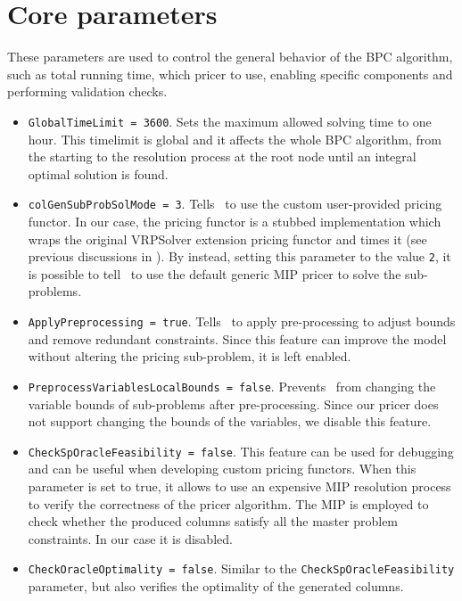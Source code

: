 \section{Core parameters}
These parameters are used to control the general behavior of the BPC algorithm,
such as total running time, which pricer to use, enabling specific
components and performing validation checks.

\begin{itemize}
	\item \texttt{GlobalTimeLimit = 3600}.
	      Sets the maximum allowed solving time to one hour.
	      This timelimit is global and it affects the whole BPC algorithm, from the starting
	      to the resolution process at the root node until an integral optimal solution is found.
	\item \texttt{colGenSubProbSolMode = 3}.
	      Tells \bapcod\ to use the custom user-provided pricing functor.
	      In our case, the pricing functor is a stubbed implementation which wraps the original VRPSolver extension pricing functor
	      and times it (see previous discussions in ).
	      By instead, setting this parameter to the value \texttt{2},
	      it is possible to tell \bapcod\ to use the default generic MIP pricer to solve the sub-problems.
	\item \texttt{ApplyPreprocessing = true}.
	      Tells \bapcod\ to apply pre-processing to adjust bounds and remove redundant constraints.
	      Since this feature can improve the model without altering the pricing sub-problem,
	      it is left enabled.
	\item \texttt{PreprocessVariablesLocalBounds = false}.
	      Prevents \bapcod\ from changing the variable bounds of sub-problems after pre-processing.
	      Since our pricer does not support changing the bounds of the variables,
	      we disable this feature.
	\item \texttt{CheckSpOracleFeasibility = false}.
	      This feature can be used for debugging and can be useful when developing custom pricing functors.
	      When this parameter is set to true, it allows to use an expensive MIP resolution process
	      to verify the correctness of the pricer algorithm.
	      The MIP is employed to check whether the produced columns satisfy all the master problem constraints.
	      In our case it is disabled.
	\item \texttt{CheckOracleOptimality = false}.
	      Similar to the \texttt{CheckSpOracleFeasibility} parameter, but also verifies the optimality of the generated columns.
\end{itemize}

